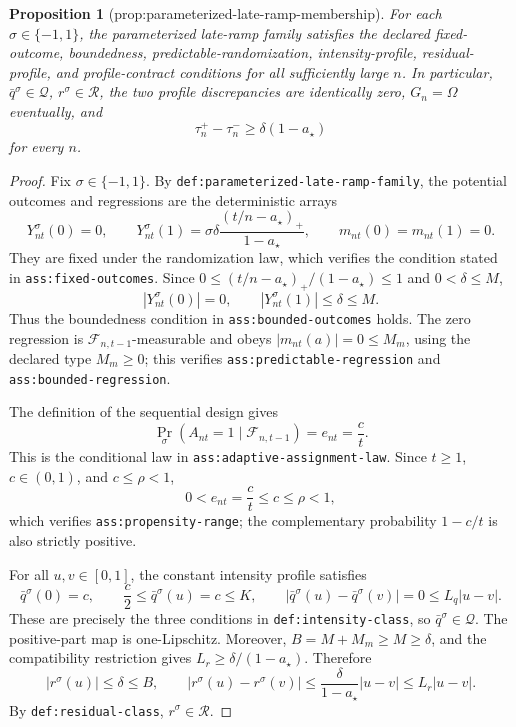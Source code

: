 \documentclass{article}
\newtheorem{proposition}{Proposition}
\begin{document}
\begin{proposition}[prop:parameterized-late-ramp-membership]\label{prop:parameterized-late-ramp-membership}
For each \(\sigma\in\{-1,1\}\), the parameterized late-ramp family satisfies the declared fixed-outcome, boundedness, predictable-randomization, intensity-profile, residual-profile, and profile-contract conditions for all sufficiently large \(n\). In particular, \(\bar q^\sigma\in\mathcal Q\), \(r^\sigma\in\mathcal R\), the two profile discrepancies are identically zero, \(G_n=\Omega\) eventually, and
\[
 \tau_n^+-\tau_n^-\ge \delta(1-a_\star)
\]
for every \(n\).
\end{proposition}
\begin{proof}
Fix \(\sigma\in\{-1,1\}\). By \texttt{def:parameterized-late-ramp-family}, the potential outcomes and regressions are the deterministic arrays
\[
 Y_{nt}^\sigma(0)=0,
 \qquad
 Y_{nt}^\sigma(1)=\sigma\delta\frac{(t/n-a_\star)_+}{1-a_\star},
 \qquad
 m_{nt}(0)=m_{nt}(1)=0.
\]
They are fixed under the randomization law, which verifies the condition stated in \texttt{ass:fixed-outcomes}. Since \(0\le (t/n-a_\star)_+/(1-a_\star)\le1\) and \(0<\delta\le M\),
\[
 |Y_{nt}^\sigma(0)|=0,
 \qquad
 |Y_{nt}^\sigma(1)|\le\delta\le M.
\]
Thus the boundedness condition in \texttt{ass:bounded-outcomes} holds. The zero regression is \(\mathcal F_{n,t-1}\)-measurable and obeys \(|m_{nt}(a)|=0\le M_m\), using the declared type \(M_m\ge0\); this verifies \texttt{ass:predictable-regression} and \texttt{ass:bounded-regression}.

The definition of the sequential design gives
\[
 \Pr_\sigma(A_{nt}=1\mid\mathcal F_{n,t-1})=e_{nt}=\frac ct.
\]
This is the conditional law in \texttt{ass:adaptive-assignment-law}. Since \(t\ge1\), \(c\in(0,1)\), and \(c\le\rho<1\),
\[
 0<e_{nt}=\frac ct\le c\le\rho<1,
\]
which verifies \texttt{ass:propensity-range}; the complementary probability \(1-c/t\) is also strictly positive.

For all \(u,v\in[0,1]\), the constant intensity profile satisfies
\[
 \bar q^\sigma(0)=c,
 \qquad
 \frac c2\le \bar q^\sigma(u)=c\le K,
 \qquad
 |\bar q^\sigma(u)-\bar q^\sigma(v)|=0\le L_q|u-v|.
\]
These are precisely the three conditions in \texttt{def:intensity-class}, so \(\bar q^\sigma\in\mathcal Q\). The positive-part map is one-Lipschitz. Moreover, \(B=M+M_m\ge M\ge\delta\), and the compatibility restriction gives \(L_r\ge\delta/(1-a_\star)\). Therefore
\[
 |r^\sigma(u)|\le\delta\le B,
 \qquad
 |r^\sigma(u)-r^\sigma(v)|
 \le \frac{\delta}{1-a_\star}|u-v|
 \le L_r|u-v|.
\]
By \texttt{def:residual-class}, \(r^\sigma\in\mathcal R\).


\end{proof}
\end{document}
